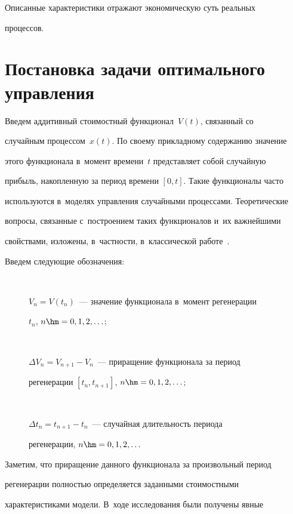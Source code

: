   Описанные характеристики отражают экономическую суть реальных 

процессов. 

  

\section{Постановка задачи оптимального управления}



  Введем аддитивный стоимостный функционал~$V(t)$, связанный со 

случайным процессом~$x(t)$. По своему прикладному содержанию значение 

этого функционала в~момент времени~$t$ представляет собой случайную 

прибыль, накопленную за период времени $[0,t]$. Такие функционалы часто 

используются в~моделях управления случайными процессами. Теоретические 

вопросы, связанные с~построением таких функционалов и~их важнейшими 

свойствами, изложены, в~частности, в~классической работе~\cite{15-sh}. 

  

  Введем следующие обозначения:

  \begin{description}

  \item[\,] $V_n=V(t_n)$~--- значение функционала в~момент регенерации 

$t_n$, $n\hm=0,1,2,\ldots$;

  \item[\,] $\Delta V_n=V_{n+1}-V_n$~--- приращение функционала за период 

регенерации $[t_n, t_{n+1}]$, $n\hm=0,1,2,\ldots$; 

  \item[\,] $\Delta t_n=t_{n+1}-t_n$~--- случайная длительность периода 

регенерации, $n\hm=0,1,2,\ldots$

  \end{description}

  

  Заметим, что приращение данного функционала за произвольный период 

регенерации полностью определяется заданными стоимостными 

характеристиками модели. В~ходе исследования были получены явные 

